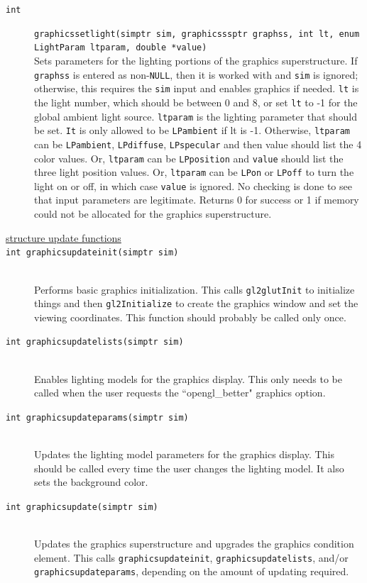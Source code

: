 \documentclass {scrbook}
\newcommand {\ttt} {\texttt}
\begin{document}
\begin{description}
\item[\ttt{int}]
\ttt{graphicssetlight(simptr sim, graphicsssptr graphss, int lt, enum LightParam ltparam, double *value)}
\hfill \\
Sets parameters for the lighting portions of the graphics superstructure. If \ttt{graphss} is entered as non-\ttt{NULL}, then it is worked with and \ttt{sim} is ignored; otherwise, this requires the \ttt{sim} input and enables graphics if needed. \ttt{lt} is the light number, which should be between 0 and 8, or set \ttt{lt} to -1 for the global ambient light source. \ttt{ltparam} is the lighting parameter that should be set. \ttt{It} is only allowed to be \ttt{LPambient} if lt is -1. Otherwise, \ttt{ltparam} can be \ttt{LPambient}, \ttt{LPdiffuse}, \ttt{LPspecular} and then value should list the 4 color values. Or, \ttt{ltparam} can be \ttt{LPposition} and \ttt{value} should list the three light position values. Or, \ttt{ltparam} can be \ttt{LPon} or \ttt{LPoff} to turn the light on or off, in which case \ttt{value} is ignored. No checking is done to see that input parameters are legitimate. Returns 0 for success or 1 if memory could not be allocated for the graphics superstructure.

\item[\underline{structure update functions}]

\item[\ttt{int graphicsupdateinit(simptr sim)}]
\hfill \\
Performs basic graphics initialization. This calls \ttt{gl2glutInit} to initialize things and then \ttt{gl2Initialize} to create the graphics window and set the viewing coordinates. This function should probably be called only once.

\item[\ttt{int graphicsupdatelists(simptr sim)}]
\hfill \\
Enables lighting models for the graphics display. This only needs to be called when the user requests the ``opengl\_better" graphics option.

\item[\ttt{int graphicsupdateparams(simptr sim)}]
\hfill \\
Updates the lighting model parameters for the graphics display. This should be called every time the user changes the lighting model. It also sets the background color.

\item[\ttt{int graphicsupdate(simptr sim)}]
\hfill \\
Updates the graphics superstructure and upgrades the graphics condition element. This calls \ttt{graphicsupdateinit}, \ttt{graphicsupdatelists}, and/or \ttt{graphicsupdateparams}, depending on the amount of updating required.


\end{description}
\end{document}
